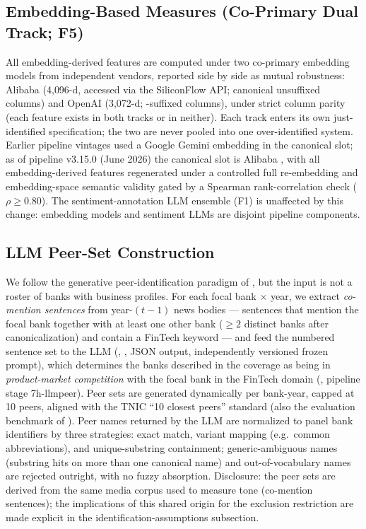 \subsection{Embedding-Based Measures (Co-Primary Dual Track; F5)}
All embedding-derived features are computed under two co-primary
embedding models from independent vendors, reported side by side as
mutual robustness: Alibaba  (4{,}096-d,
accessed via the SiliconFlow API; canonical unsuffixed columns) and
OpenAI  (3{,}072-d; -suffixed
columns), under strict column parity (each feature exists in both
tracks or in neither). Each track enters its own just-identified
specification; the two are never pooled into one over-identified
system. Earlier pipeline vintages used a Google Gemini embedding in
the canonical slot; as of pipeline v3.15.0 (June 2026) the canonical
slot is Alibaba , with all embedding-derived
features regenerated under a controlled full re-embedding and
embedding-space semantic validity gated by a Spearman
rank-correlation check ($\rho \geq 0.80$). The sentiment-annotation
LLM ensemble (F1) is unaffected by this change: embedding models and
sentiment LLMs are disjoint pipeline components.

\subsection{LLM Peer-Set Construction}
We follow the generative peer-identification paradigm of \textcite{cao2025genai}, but the
input is not a roster of banks with business profiles. For each focal bank $\times$ year, we
extract \emph{co-mention sentences} from year-$(t-1)$ news bodies --- sentences that mention
the focal bank together with at least one other bank ($\geq 2$ distinct banks after
canonicalization) and contain a FinTech keyword --- and feed the numbered sentence set to the
LLM (, , JSON output, independently versioned frozen
prompt), which determines the banks described in the coverage as being in \emph{product-market
competition} with the focal bank in the FinTech domain (, pipeline
stage 7h-llmpeer). Peer sets are generated dynamically per bank-year, capped at 10 peers,
aligned with the \textcite{hoberg2016textnetwork} TNIC ``10 closest peers'' standard (also
the evaluation benchmark of \textcite{cao2025genai}). Peer names returned by the LLM are
normalized to panel bank identifiers by three strategies: exact match, variant mapping (e.g.\
common abbreviations), and unique-substring containment; generic-ambiguous names (substring
hits on more than one canonical name) and out-of-vocabulary names are rejected outright, with
no fuzzy absorption. Disclosure: the peer sets are derived from the same media corpus used to
measure tone (co-mention sentences); the implications of this shared origin for the exclusion
restriction are made explicit in the identification-assumptions subsection.


